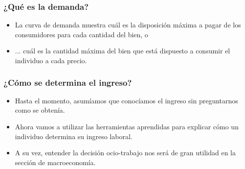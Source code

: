 \documentclass{beamer}
\begin{document}
\begin{frame}
\frametitle{¿Qué es la demanda?}
\begin{itemize}
    \item La curva de demanda muestra cuál es la disposición máxima a pagar de los consumidores para cada cantidad del bien, o \vspace{2mm}
    \item ... cuál es la cantidad máxima del bien que está dispuesto a consumir el individuo a cada precio.
\end{itemize}
\end{frame}




\begin{frame}
\frametitle{¿Cómo se determina el ingreso?}
\begin{itemize}
    \item Hasta el momento, asumíamos que  conocíamos el ingreso sin preguntarnos como se obtenía. 
    \item Ahora vamos a utilizar las herramientas aprendidas para explicar cómo un individuo determina su ingreso laboral.
    \item A su vez, entender la decisión ocio-trabajo nos será de gran utilidad en la sección de macroeconomía. 
\end{itemize}
\end{frame}
\end{document}
